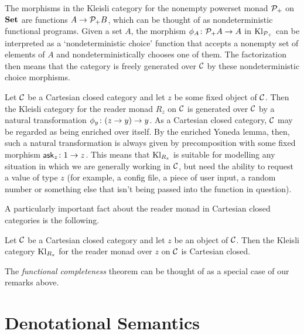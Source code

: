 \begin{example}
  The morphisms in the Kleisli category for the nonempty powerset monad $\mathcal P_+$ on ${\normalfont\textbf{Set}}$ are functions $A \to \mathcal P_+B$, which can be thought of as nondeterministic functional programs.  
  Given a set $A$, the morphism $\phi_A\colon \mathcal P_+A \to A$ in $\operatorname{Kl}_{\mathcal P_+}$ can be interpreted as a `nondeterministic choice' function that accepts a nonempty set of elements of $A$ and nondeterministically chooses one of them.
  The factorization then means that the category is freely generated over ${\mathcal{C}}$ by these nondeterministic choice morphisms.
\end{example}
\begin{example}
  Let ${\mathcal{C}}$ be a Cartesian closed category and let $z$ be some fixed object of ${\mathcal{C}}$.  
  Then the Kleisli category for the reader monad $R_z$ on ${\mathcal{C}}$ is generated over ${\mathcal{C}}$ by a natural transformation $\phi_y\colon (z \to y) \to y$.  
  As a Cartesian closed category, ${\mathcal{C}}$ may be regarded as being enriched over itself.
  By the enriched Yoneda lemma, then, such a natural transformation is always given by precomposition with some fixed morphism $\operatorname{{\mathsf{ask}}}_z\colon 1 \to z$.  
  This means that $\operatorname{Kl}_{R_z}$ is suitable for modelling any situation in which we are generally working in ${\mathcal{C}}$, but need the ability to request a value of type $z$ (for example, a config file, a piece of user input, a random number or something else that isn't being passed into the function in question).
  \label{ExReaderMonadKleisli}
\end{example}

A particularly important fact about the reader monad in Cartesian closed categories is the following.

\begin{theorem}
  Let ${\mathcal{C}}$ be a Cartesian closed category and let $z$ be an object of ${\mathcal{C}}$.  
  Then the Kleisli category $\operatorname{Kl}_{R_z}$ for the reader monad over $z$ on ${\mathcal{C}}$ is Cartesian closed.
  \label{FunctionalCompletenessCcc}
\end{theorem}

The \emph{functional completeness} theorem \cite{FunctionalCompleteness} can be thought of as a special case of our remarks above.

\section{Denotational Semantics}

